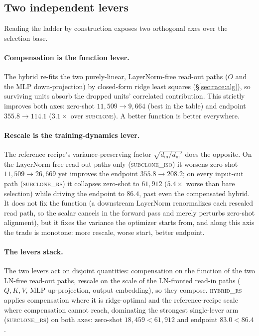 \subsection{Two independent levers}
\label{sec:race:levers}

Reading the ladder by construction exposes two orthogonal axes over the
selection base.

\paragraph{Compensation is the function lever.}
The hybrid re-fits the two purely-linear, LayerNorm-free read-out paths ($O$ and
the MLP down-projection) by closed-form ridge least squares
(\S\ref{sec:race:alg}), so surviving units absorb the dropped units' correlated
contribution. This strictly improves both axes: zero-shot
$11{,}509\to9{,}664$ (best in the table) and endpoint $355.8\to114.1$
($3.1\times$ over \textsc{subclone}). A better function is better everywhere.

\paragraph{Rescale is the training-dynamics lever.}
The reference recipe's variance-preserving factor
$\sqrt{d_{\text{in}}/d_{\text{in}}'}$ \citep{samragh2023weight} does the
opposite. On the LayerNorm-free read-out paths only (\textsc{subclone\_iso}) it
worsens zero-shot $11{,}509\to26{,}669$ yet improves the endpoint
$355.8\to208.2$; on every input-cut path (\textsc{subclone\_rs}) it collapses
zero-shot to $61{,}912$ ($5.4\times$ worse than bare selection) while
driving the endpoint to $86.4$, past even the compensated hybrid. It does not fix
the function (a downstream LayerNorm renormalizes each rescaled read path, so
the scalar cancels in the forward pass and merely perturbs zero-shot alignment),
but it fixes the variance the optimizer starts from, and along this axis the
trade is monotone: more rescale, worse start, better endpoint.

\paragraph{The levers stack.}
The two levers act on disjoint quantities: compensation on the function of the
two LN-free read-out paths, rescale on the scale of the LN-fronted read-in paths
($Q,K,V$, MLP up-projection, output embedding), so they compose.
\textsc{hybrid\_rs} applies compensation where it is ridge-optimal and the
reference-recipe scale where compensation cannot reach, dominating the strongest
single-lever arm (\textsc{subclone\_rs}) on both axes: zero-shot
$18{,}459 < 61{,}912$ and endpoint $83.0 < 86.4$.

